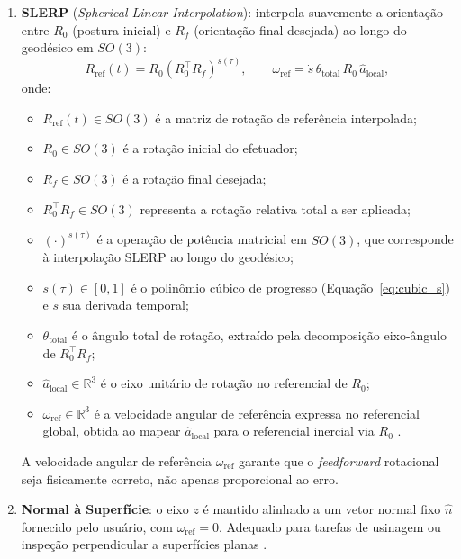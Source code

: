 \begin{enumerate}
    \item \textbf{SLERP} (\textit{Spherical Linear Interpolation}): interpola suavemente a orientação entre $R_0$ (postura inicial) e $R_f$ (orientação final desejada) ao longo do geodésico em $SO(3)$:
    \begin{equation}
        R_{\text{ref}}(t) = R_0 \left(R_0^\top R_f\right)^{s(\tau)}, \qquad
        \omega_{\text{ref}} = \dot{s}\,\theta_{\text{total}}\,R_0\,\hat{a}_{\text{local}},
        \label{eq:slerp_impl}
    \end{equation}
    onde:
    \begin{itemize}
        \item $R_{\text{ref}}(t) \in SO(3)$ é a matriz de rotação de referência interpolada;
        \item $R_0 \in SO(3)$ é a rotação inicial do efetuador;
        \item $R_f \in SO(3)$ é a rotação final desejada;
        \item $R_0^\top R_f \in SO(3)$ representa a rotação relativa total a ser aplicada;
        \item $(\cdot)^{s(\tau)}$ é a operação de potência matricial em $SO(3)$, que corresponde à interpolação SLERP ao longo do geodésico;
        \item $s(\tau) \in [0,1]$ é o polinômio cúbico de progresso (Equação~\eqref{eq:cubic_s}) e $\dot{s}$ sua derivada temporal;
        \item $\theta_{\text{total}}$ é o ângulo total de rotação, extraído pela decomposição eixo-ângulo de $R_0^\top R_f$;
        \item $\hat{a}_{\text{local}} \in \mathbb{R}^3$ é o eixo unitário de rotação no referencial de $R_0$;
        \item $\omega_{\text{ref}} \in \mathbb{R}^3$ é a velocidade angular de referência expressa no referencial global, obtida ao mapear $\hat{a}_{\text{local}}$ para o referencial inercial via $R_0$ \cite{shoemake1985animating, dam1998quaternions}.
    \end{itemize}
    A velocidade angular de referência $\omega_{\text{ref}}$ garante que o \textit{feedforward} rotacional seja fisicamente correto, não apenas proporcional ao erro.
    
    \item \textbf{Normal à Superfície}: o eixo $z$ é mantido alinhado a um vetor normal fixo $\hat{n}$ fornecido pelo usuário, com $\omega_{\text{ref}} = 0$. Adequado para tarefas de usinagem ou inspeção perpendicular a superfícies planas \cite{siciliano2009robotics}.
\end{enumerate}

